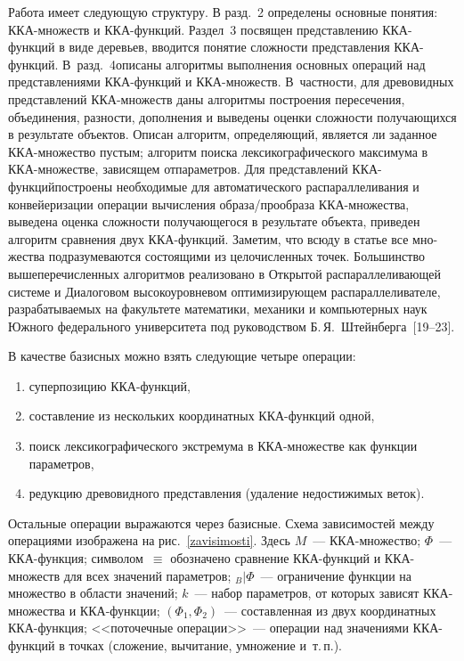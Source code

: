 \begin{multicols}{2}
Работа имеет следующую структуру. В разд.~2 определены основные
понятия: ККА-мно\-жеств и ККА-функ\-ций. Раздел~3 посвящен представлению
ККА-функ\-ций в виде деревьев, вводится понятие сложности
представления ККА-функ\-ций. В~разд.~4\linebreak описаны алгоритмы
выполнения основных опе\-раций над представлениями ККА-функ\-ций и\linebreak
ККА-мно\-жеств. В~част\-ности, для древовидных пред\-став\-ле\-ний
ККА-мно\-жеств даны алгоритмы по\-стро\-ения пересечения, объединения,
разности, дополнения и выведены оценки сложности получающихся в
результате объектов. Описан алгоритм, определяющий, является ли
заданное ККА-мно\-жест\-во пустым; алгоритм поиска лексикографического
максимума в ККА-мно\-жест\-ве, зависящем от\linebreak параметров. Для
представлений ККА-функ\-ций\linebreak построены необходимые для автоматического
распараллеливания и конвейеризации операции вы\-чис\-ле\-ния
образа/прообраза ККА-мно\-же\-ст\-ва, выведена оценка сложности
получающегося в результате объекта, приведен алгоритм сравнения двух
ККА-функ\-ций. Заметим, что всюду в статье все мно-\linebreak жества
подразумеваются состоящими из це\-ло\-чис\-лен\-ных точек. Большинство
вышеперечисленных алгоритмов реализовано в Открытой
распараллеливающей системе и Диалоговом высокоуровневом
оптимизирующем распараллеливателе, разрабатываемых на факультете
математики, механики и компьютерных наук Южного федерального
университета под руководством Б.\,Я.~Штейнберга~[19--23].

В качестве базисных можно взять следующие четыре операции:
\begin{enumerate}[(1)]
\item суперпозицию ККА-функ\-ций, \\[-15pt]
\item составление из нескольких координатных
ККА-функ\-ций одной, 
\item поиск лексикографического экстремума в
ККА-мно\-жест\-ве как функции па\-ра\-мет\-ров, 
\item редукцию древовидного
пред\-став\-ле\-ния (удаление недостижимых веток).
\end{enumerate}
 Остальные операции
выражаются через базисные. Схема зависимостей между операциями
изображена на рис.~\ref{zavisimosti}.
Здесь $M$~--- ККА-множество; $\Phi$~--- ККА-функ\-ция; символом~$\equiv$
обозначено сравнение ККА-функ\-ций и ККА-мно\-жеств для всех значений
па\-ра\-мет\-ров; $_B|\Phi$~--- ограничение функции на множество в об\-ласти
значений; $k$~--- набор па\-ра\-мет\-ров, от которых зависят ККА-мно\-жест\-ва
и ККА-функ\-ции; $(\Phi_1,\Phi_2)$~--- составленная из двух
координатных ККА-функ\-ция; <<поточечные операции>>~--- операции над
значениями ККА-функ\-ций в точках (сложение, вычитание, умно\-же\-ние 
и~т.\,п.).



\end{multicols}
